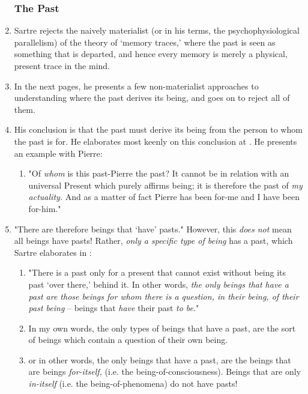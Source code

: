 \begin{enumerate}
  \subsubsection*{The Past}
  \item Sartre rejects the naively materialist (or in his terms, the psychophysiological parallelism) of the theory of `memory traces,' where the past is seen as something that is departed, and hence every memory is merely a physical, present trace in the mind.
  \item In the next pages, he presents a few non-materialist approaches to understanding where the past derives its being, and goes on to reject all of them.
  \item His conclusion is that the past must derive its being from the person to whom the past is for. He elaborates most keenly on this conclusion at \autocite[169]{sartre}. He presents an example with Pierre:
  \begin{enumerate}
    \item "Of \emph{whom} is this past-Pierre the past? It cannot be in relation with an universal Present which purely affirms being; it is therefore the past of \emph{my actuality.} And as a matter of fact Pierre has been for-me and I have been for-him." \autocite[170]{sartre}
  \end{enumerate}
  \item "There are therefore beings that `have' pasts." \autocite[170]{sartre} However, this \emph{does not} mean all beings have pasts! Rather, \emph{only a specific type of being} has a past, which Sartre elaborates in \autocite[172]{sartre}:
  \begin{enumerate}
    \item "There is a past only for a present that cannot exist without being its past `over there,' behind it. In other words, \emph{the only beings that have a past are those beings for whom there is a question, in their being, of their past being} -- beings that \emph{have} their past \emph{to be}." \autocite[172]{sartre}
    \item In my own words, the only types of beings that have a past, are the sort of beings which contain a question of their own being.
    \item or in other words, the only beings that have a past, are the beings that are beings \emph{for-itself,} (i.e. the being-of-consciousness). Beings that are only \emph{in-itself} (i.e. the being-of-phenomena) do not have pasts!

\end{enumerate}
\end{enumerate}
